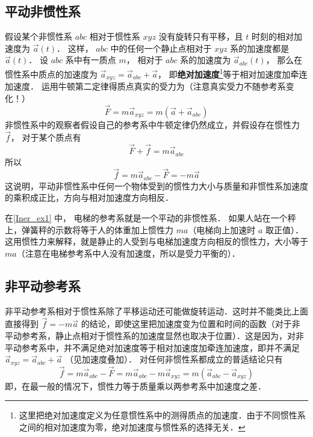 \subsection{平动非惯性系}
假设某个非惯性系 $abc$ 相对于惯性系 $xyz$ 没有旋转只有平移，且 $t$ 时刻的相对加速度为 $\vec a(t)$． 这样， $abc$ 中的任何一个静止点相对于 $xyz$ 系的加速度都是 $\vec a(t)$． 设 $abc$ 系中有一质点 $m$， 相对于 $abc$ 系的加速度为 $\vec a_{abc} (t)$， 那么在惯性系中质点的加速度为 ${\vec a_{xyz}} = {\vec a_{abc}} + \vec a$， 即\textbf{绝对加速度}\footnote{这里把绝对加速度定义为任意惯性系中的测得质点的加速度．由于不同惯性系之间的相对加速度为零，绝对加速度与惯性系的选择无关．}等于相对加速度加牵连加速度． 运用牛顿第二定律得质点真实的受力为（注意真实受力不随参考系变化！）
\begin{equation}
\vec F = m {\vec a}_{xyz} = m(\vec a + {\vec a}_{abc} )
\end{equation}
非惯性系中的观察者假设自己的参考系中牛顿定律仍然成立，并假设存在惯性力 $\vec f$， 对于某个质点有
\begin{equation}
\vec F + \vec f = m \vec a_{abc}
\end{equation}
所以
\begin{equation}
\vec f = m{\vec a_{abc}} - \vec F =  - m\vec a
\end{equation}
这说明，平动非惯性系中任何一个物体受到的惯性力大小与质量和非惯性系加速度的乘积成正比，方向与相对加速度方向相反．

在\autoref{Iner_ex1} 中， 电梯的参考系就是一个平动的非惯性系． 如果人站在一个秤上，弹簧秤的示数将等于人的体重加上惯性力 $ma$（电梯向上加速时 $a$ 取正值）． 这用惯性力来解释，就是静止的人受到与电梯加速度方向相反的惯性力，大小等于 $ma$（注意在电梯参考系中人没有加速度，所以是受力平衡的）．

\subsection{非平动参考系}

非平动参考系相对于惯性系除了平移运动还可能做旋转运动．这时并不能类比上面直接得到 $\vec f =  - m\vec a$ 的结论，即使这里把加速度变为位置和时间的函数（对于非平动参考系，静止点相对于惯性系的加速度显然也取决于位置）．这是因为，对非平动参考系中，并不满足绝对加速度等于相对加速度加牵连加速度，即并不满足 $\vec a_{xyz} = \vec a_{abc} + \vec a$ （见加速度叠加）． %
对任何非惯性系都成立的普适结论只有
\begin{equation}
\vec f = m{\vec a_{abc}} - \vec F = m{\vec a_{abc}} - m{\vec a_{xyz}} = m( \vec a_{abc} - \vec a_{xyz})
\end{equation}
即，在最一般的情况下，惯性力等于质量乘以两参考系中加速度之差．


